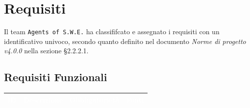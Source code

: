 \section{Requisiti}\label{Requisiti}

Il team \texttt{Agents of S.W.E.} ha classififcato e assegnato i requisiti con un identificativo univoco, secondo quanto definito nel documento \textit{Norme di progetto v4.0.0} nella sezione §2.2.2.1.

\subsection{Requisiti Funzionali}\label{RF}
\begin{center}
\begin{longtable}[c]{|m{}|m{}|m{}|m{}|}
\hline
\rowcolor{bluelogo}\textbf{\textcolor{white}{ID}} & \textbf{\textcolor{white}{Descrizione}} & \textbf{\textcolor{white}{Obbligatorietà}} & \textbf{\textcolor{white}{Fonti}}\\
\hline \hline
\endhead


\end{longtable}
\end{center}
